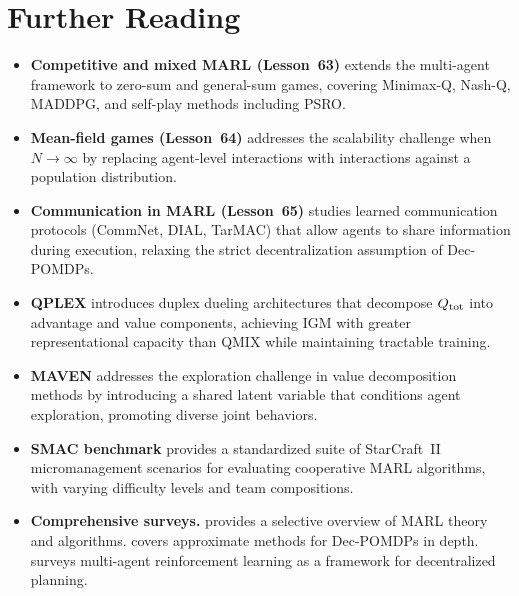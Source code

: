 \documentclass[11pt,a4paper]{article}
\begin{document}
\section{Further Reading}
\label{sec:further-reading}

\begin{itemize}
  \item \textbf{Competitive and mixed MARL (Lesson~63)} extends
    the multi-agent framework to zero-sum and general-sum games,
    covering Minimax-Q, Nash-Q, MADDPG, and self-play methods
    including PSRO.

  \item \textbf{Mean-field games (Lesson~64)} addresses the
    scalability challenge when $N \to \infty$ by replacing
    agent-level interactions with interactions against a
    population distribution.

  \item \textbf{Communication in MARL (Lesson~65)} studies
    learned communication protocols (CommNet, DIAL, TarMAC)
    that allow agents to share information during execution,
    relaxing the strict decentralization assumption of
    Dec-POMDPs.

  \item \textbf{QPLEX} \citep{wang2021} introduces duplex
    dueling architectures that decompose $Q_{\mathrm{tot}}$ into
    advantage and value components, achieving IGM with
    greater representational capacity than QMIX while
    maintaining tractable training.

  \item \textbf{MAVEN} \citep{mahajan2019} addresses the
    exploration challenge in value decomposition methods by
    introducing a shared latent variable that conditions
    agent exploration, promoting diverse joint behaviors.

  \item \textbf{SMAC benchmark} \citep{samvelyan2019} provides
    a standardized suite of StarCraft~II micromanagement
    scenarios for evaluating cooperative MARL algorithms,
    with varying difficulty levels and team compositions.

  \item \textbf{Comprehensive surveys.}  \citet{zhang2021}
    provides a selective overview of MARL theory and algorithms.
    \citet[Chapters~6--8]{oliehoek2016} covers approximate
    methods for Dec-POMDPs in depth.  \citet{kraemer2016}
    surveys multi-agent reinforcement learning as a framework
    for decentralized planning.
\end{itemize}


\end{document}
